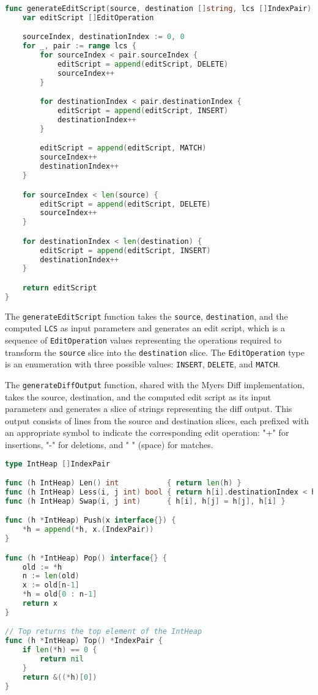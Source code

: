 \begin{lstlisting}[language=go]
func generateEditScript(source, destination []string, lcs []IndexPair) []EditOperation {
	var editScript []EditOperation

	sourceIndex, destinationIndex := 0, 0
	for _, pair := range lcs {
		for sourceIndex < pair.sourceIndex {
			editScript = append(editScript, DELETE)
			sourceIndex++
		}

		for destinationIndex < pair.destinationIndex {
			editScript = append(editScript, INSERT)
			destinationIndex++
		}

		editScript = append(editScript, MATCH)
		sourceIndex++
		destinationIndex++
	}

	for sourceIndex < len(source) {
		editScript = append(editScript, DELETE)
		sourceIndex++
	}

	for destinationIndex < len(destination) {
		editScript = append(editScript, INSERT)
		destinationIndex++
	}

	return editScript
}
\end{lstlisting}
\medskip

The \lstinline{generateEditScript} function takes the \lstinline{source}, \lstinline{destination}, and the computed \lstinline{LCS} as input parameters and generates an edit script, which is a sequence of \lstinline{EditOperation} values representing the operations required to transform the \lstinline{source} slice into the \lstinline{destination} slice. The \lstinline{EditOperation} type is an enumeration with three possible values: \lstinline{INSERT}, \lstinline{DELETE}, and \lstinline{MATCH}.
\smallskip

The \lstinline{generateDiffOutput} function, shared with the Myers Diff implementation, takes the source, destination, and the computed edit script as its input parameters and generates a slice of strings representing the diff output. This output consists of lines from the source and destination slices, each prefixed with an appropriate symbol to indicate the corresponding edit operation: "+" for insertions, "-" for deletions, and " " (space) for matches.

\begin{lstlisting}[language=go]
type IntHeap []IndexPair

func (h IntHeap) Len() int           { return len(h) }
func (h IntHeap) Less(i, j int) bool { return h[i].destinationIndex < h[j].destinationIndex }
func (h IntHeap) Swap(i, j int)      { h[i], h[j] = h[j], h[i] }

func (h *IntHeap) Push(x interface{}) {
	*h = append(*h, x.(IndexPair))
}

func (h *IntHeap) Pop() interface{} {
	old := *h
	n := len(old)
	x := old[n-1]
	*h = old[0 : n-1]
	return x
}

// Top returns the top element of the IntHeap
func (h *IntHeap) Top() *IndexPair {
	if len(*h) == 0 {
		return nil
	}
	return &((*h)[0])
}
\end{lstlisting}
\medskip

